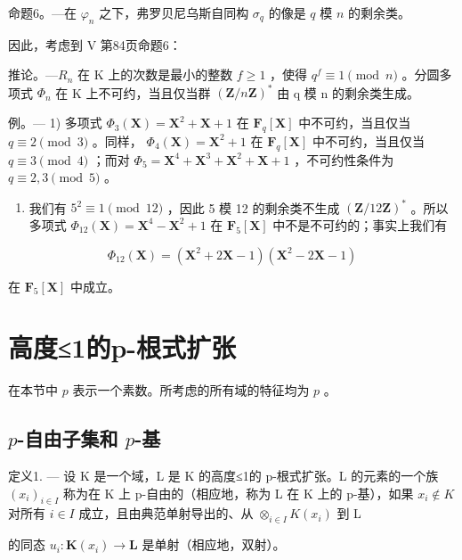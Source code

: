 命题6。---在 \(\varphi_{n}\) 之下，弗罗贝尼乌斯自同构 \(\sigma_{q}\) 的像是 \(q\) 模 \(n\) 的剩余类。

因此，考虑到 V 第84页命题6：

推论。---\(R_{n}\) 在 K 上的次数是最小的整数 \(f \geqslant 1\) ，使得 \(q^{f} \equiv 1 \pmod{n}\) 。分圆多项式 \(\Phi_{n}\) 在 K 上不可约，当且仅当群 \((\mathbf{Z}/n\mathbf{Z})^{*}\) 由 q 模 n 的剩余类生成。

例。--- 1) 多项式 \(\Phi_3(\mathbf{X}) = \mathbf{X}^2 + \mathbf{X} + 1\) 在 \(\mathbf{F}_q[\mathbf{X}]\) 中不可约，当且仅当 \(q \equiv 2 \pmod{3}\) 。同样， \(\Phi_4(\mathbf{X}) = \mathbf{X}^2 + 1\) 在 \(\mathbf{F}_q[\mathbf{X}]\) 中不可约，当且仅当 \(q \equiv 3 \pmod{4}\) ；而对 \(\Phi_5 = \mathbf{X}^4 + \mathbf{X}^3 + \mathbf{X}^2 + \mathbf{X} + 1\) ，不可约性条件为 \(q \equiv 2, 3 \pmod{5}\) 。

\begin{enumerate}
\def\labelenumi{\arabic{enumi})}
\setcounter{enumi}{1}
\tightlist
\item
  我们有 \(5^2 \equiv 1 \pmod{12}\) ，因此 5 模 12 的剩余类不生成 \((\mathbf{Z}/12\mathbf{Z})^*\) 。所以多项式 \(\Phi_{12}(\mathbf{X}) = \mathbf{X}^4 - \mathbf{X}^2 + 1\) 在 \(\mathbf{F}_5[\mathbf{X}]\) 中不是不可约的；事实上我们有
\end{enumerate}

\[
\Phi_ {12} (\mathbf {X}) = \left(\mathbf {X} ^ {2} + 2 \mathbf {X} - 1\right) \left(\mathbf {X} ^ {2} - 2 \mathbf {X} - 1\right)
\]

在 \(\mathbf{F}_5[\mathbf{X}]\) 中成立。

\section{高度≤1的p-根式扩张}

在本节中 \(p\) 表示一个素数。所考虑的所有域的特征均为 \(p\) 。

\subsection{\texorpdfstring{\(p\)-自由子集和 \(p\)-基}{p-自由子集和 p-基}}

定义1. --- 设 K 是一个域，L 是 K 的高度≤1的 p-根式扩张。L 的元素的一个族 \((x_i)_{i \in I}\) 称为在 K 上 p-自由的（相应地，称为 L 在 K 上的 p-基），如果 \(x_i \notin K\) 对所有 \(i \in I\) 成立，且由典范单射导出的、从 \(\otimes_{i \in I} K(x_i)\) 到 L

的同态 \(u_{i}:\mathbf{K}(x_{i})\to \mathbf{L}\) 是单射（相应地，双射）。

